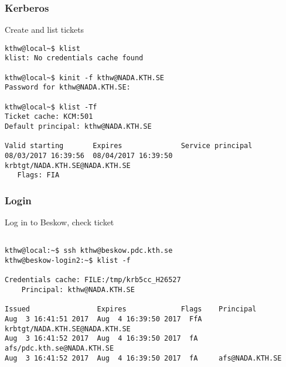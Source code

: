 \begin{frame}[fragile]
  \frametitle{Kerberos}
  \begin{alertblock}{Create and list tickets}
    \verbatimfont{\footnotesize}
    \begin{verbatim}
kthw@local~$ klist
klist: No credentials cache found
      
kthw@local~$ kinit -f kthw@NADA.KTH.SE
Password for kthw@NADA.KTH.SE:

kthw@local~$ klist -Tf  
Ticket cache: KCM:501
Default principal: kthw@NADA.KTH.SE

Valid starting       Expires              Service principal
08/03/2017 16:39:56  08/04/2017 16:39:50  krbtgt/NADA.KTH.SE@NADA.KTH.SE
   Flags: FIA

  \end{verbatim}
  \end{alertblock}

\end{frame}




\begin{frame}[fragile]
  \frametitle{Login}
  \begin{alertblock}{Log in to Beskow, check ticket}
    \verbatimfont{\footnotesize}
    \begin{verbatim}

kthw@local:~$ ssh kthw@beskow.pdc.kth.se
kthw@beskow-login2:~$ klist -f

Credentials cache: FILE:/tmp/krb5cc_H26527
    Principal: kthw@NADA.KTH.SE

Issued                Expires             Flags    Principal
Aug  3 16:41:51 2017  Aug  4 16:39:50 2017  FfA    krbtgt/NADA.KTH.SE@NADA.KTH.SE
Aug  3 16:41:52 2017  Aug  4 16:39:50 2017  fA     afs/pdc.kth.se@NADA.KTH.SE
Aug  3 16:41:52 2017  Aug  4 16:39:50 2017  fA     afs@NADA.KTH.SE

 \end{verbatim}
\end{alertblock}



\end{frame}




